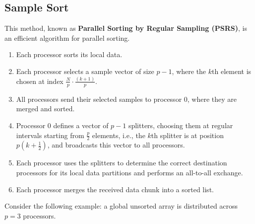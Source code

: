 \documentclass[12pt]{book}
\begin{document}
\subsection{Sample Sort}
This method, known as \textbf{Parallel Sorting by Regular Sampling (PSRS)}, is an efficient algorithm for parallel sorting.

\begin{enumerate}
    \item Each processor sorts its local data.
    \item Each processor selects a sample vector of size $p-1$, where the $k$th element is chosen at index $\frac{N}{p} \cdot \frac{(k+1)}{p}$.
    \item All processors send their selected samples to processor $0$, where they are merged and sorted.
    \item Processor $0$ defines a vector of $p-1$ splitters, choosing them at regular intervals starting from $\frac{p}{2}$ elements, i.e., the $k$th splitter is at position $p\left(k+\frac{1}{2}\right)$, and broadcasts this vector to all processors.
    \item Each processor uses the splitters to determine the correct destination processors for its local data partitions and performs an all-to-all exchange.
    \item Each processor merges the received data chunk into a sorted list.
\end{enumerate}

Consider the following example: a global unsorted array is distributed across $p=3$ processors.
\end{document}
